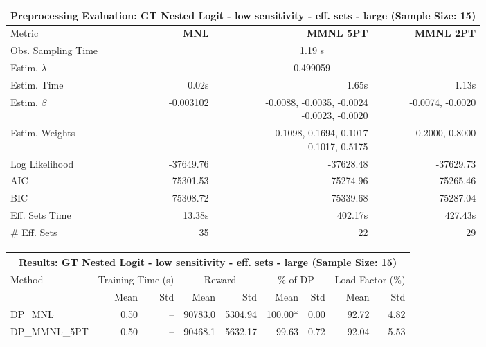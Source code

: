 
\begin{samepage}
\begin{center}
  \small
  \begin{tabular}{l|r|r|r}
    \toprule
    \multicolumn{4}{c}{\textbf{Preprocessing Evaluation: GT Nested Logit - low sensitivity - eff. sets - large (Sample Size: 15)}} \\
    \midrule
    Metric & \textbf{MNL} & \textbf{MMNL 5PT} & \textbf{MMNL 2PT} \\
    \midrule
    Obs. Sampling Time & \multicolumn{3}{c}{1.19 s} \\
    Estim. $\lambda$ & \multicolumn{3}{c}{0.499059} \\
    Estim. Time & 0.02s & 1.65s & 1.13s \\
    Estim. $\beta$ & -0.003102 & \makecell[tr]{-0.0088, -0.0035, -0.0024 \\ -0.0023, -0.0020} & -0.0074, -0.0020 \\
    Estim. Weights & - & \makecell[tr]{0.1098, 0.1694, 0.1017 \\ 0.1017, 0.5175} & 0.2000, 0.8000 \\
    Log Likelihood & -37649.76 & -37628.48 & -37629.73 \\
    AIC & 75301.53 & 75274.96 & 75265.46 \\
    BIC & 75308.72 & 75339.68 & 75287.04 \\
    Eff. Sets Time & 13.38s & 402.17s & 427.43s \\
    \# Eff. Sets & 35 & 22 & 29 \\
    \bottomrule
  \end{tabular}
\end{center}
\begin{center}
  \small
  \begin{tabular}{l|rr|rr|rr|rr}
    \toprule
    \multicolumn{9}{c}{\textbf{Results: GT Nested Logit - low sensitivity - eff. sets - large (Sample Size: 15)}} \\
    \midrule
    Method & \multicolumn{2}{c|}{Training Time (s)} & \multicolumn{2}{c|}{Reward} & \multicolumn{2}{c|}{\% of DP} & \multicolumn{2}{c}{Load Factor (\%)} \\
    & Mean & Std & Mean & Std & Mean & Std & Mean & Std \\
    \midrule
    DP\_MNL      &     0.50 &    -- &    90783.0 &    5304.94 & 100.00* &    0.00 &   92.72 &    4.82 \\
    DP\_MMNL\_5PT &     0.50 &    -- &    90468.1 &    5632.17 &   99.63 &    0.72 &   92.04 &    5.53 \\

\end{tabular}
\end{center}
\end{samepage}
